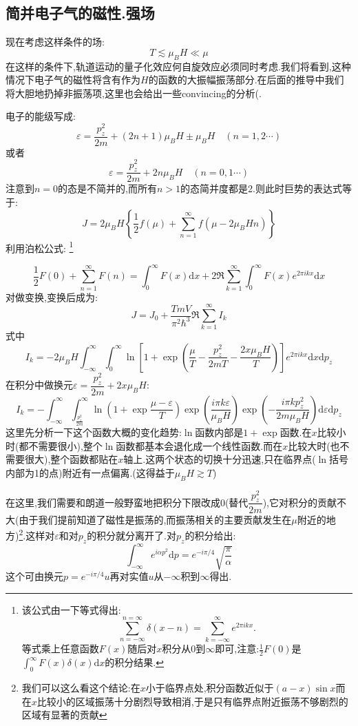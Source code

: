 \subsection{简并电子气的磁性.强场}
    现在考虑这样条件的场:
    \[T \lesssim \mu_BH\ll\mu\]
    在这样的条件下,轨道运动的量子化效应何自旋效应必须同时考虑.我们将看到,这种情况下电子气的磁性将含有作为$H$的函数的大振幅振荡部分.在后面的推导中我们将大胆地扔掉非振荡项,这里也会给出一些convincing的分析(.
    
    电子的能级写成:
    \[\varepsilon=\frac{p_z^{2}}{2m}+(2n+1)\mu_BH \pm \mu_BH\quad (n=1,2\cdots )\]
    或者
    \[\varepsilon=\frac{p_z^{2}}{2m}+2n\mu_BH\quad (n=0,1\cdots)\]
    注意到$n=0$的态是不简并的,而所有$n>1$的态简并度都是2.则此时巨势的表达式等于:
    \begin{equation}
      J=2\mu_BH\left\{ \frac{1}{2}f(\mu)+\sum_{n=1}^{\infty} f(\mu-2\mu_BHn) \right\} 
    \end{equation}
    利用泊松公式:
    \footnote{该公式由一下等式得出:\[\sum_{n=-\infty}^{n=\infty}\delta(x-n)=\sum_{k=-\infty}^{\infty}e^{2\pi ikx}.\]等式乘上任意函数$F(x)$随后对$x$积分从$0$到$\infty$即可,注意:$\frac{1}{2}F(0)$是$\int_{0}^{\infty}F(x)\delta(x)\mathrm{d} x$的积分结果.}

    \begin{equation}
      \frac{1}{2}F(0)+\sum_{n=1}^{\infty}F(n)=\int_{0}^{\infty} F(x) \mathrm{d}x+2\Re \sum_{k=1}^{\infty}\int_{0}^{\infty} F(x)e^{2\pi i kx} \mathrm{d}x
    \end{equation}
    对做变换,变换后成为:
    \[J=J_0+\frac{TmV}{\pi^{2}\hbar^{3}}\Re \sum_{k=1}^{\infty}I_k\]
    式中 
    \begin{equation}
      I_k=-2\mu_BH\int_{-\infty}^{\infty} \int_{0}^{\infty} \ln\left[ 1+\exp(\frac{\mu}{T}-\frac{p_z^{2}}{2mT}-\frac{2x\mu_BH}{T}) \right] e^{2\pi ikx} \mathrm{d}x \mathrm{d} p_z
    \end{equation}
    在积分中做换元$\varepsilon=\dfrac{p_z^{2}}{2m}+2x\mu_BH$:
    \[I_k=-\int_{-\infty}^{\infty} \int_{\frac{p_z^{2}}{2m}}^{\infty} \ln(1+\exp\frac{\mu-\varepsilon}{T})\exp(\frac{i\pi k\varepsilon}{\mu_BH})\exp(-\frac{i\pi kp_z^{2}}{2m\mu_BH}) \mathrm{d}\varepsilon \mathrm{d}p_z\]
    这里先分析一下这个函数大概的变化趋势:$\ln$函数内部是$1+\exp$函数.在$x$比较小时(都不需要很小),整个$\ln$函数都基本会退化成一个线性函数.而在$x$比较大时(也不需要很大),整个函数都贴在$x$轴上.这两个状态的切换十分迅速,只在临界点($\ln$括号内部为1的点)附近有一点偏离.(这得益于$\mu_BH \gtrsim T$)

    在这里,我们需要和朗道一般野蛮地把积分下限改成0(替代$\dfrac{p_z^{2}}{2m}$),它对积分的贡献不大(由于我们提前知道了磁性是振荡的,而振荡相关的主要贡献发生在$\mu$附近的地方)\footnote{我们可以这么看这个结论:在$x$小于临界点处,积分函数近似于$(a-x)\sin x$而在$x$比较小的区域振荡十分剧烈导致相消,于是只有临界点附近振荡不够剧烈的区域有显著的贡献}.这样对$\varepsilon$和对$p_{z}$的积分就分离开了.对$p_{z}$的积分给出:
    \[\int_{-\infty}^{\infty} e^{i\alpha p^{2}} \mathrm{d}p=e^{-i\pi / 4} \sqrt{\frac{\pi}{\alpha}}\]
    这个可由换元$p=e^{-i\pi / 4}u$再对实值$u$从$-\infty$积到$\infty$得出.

